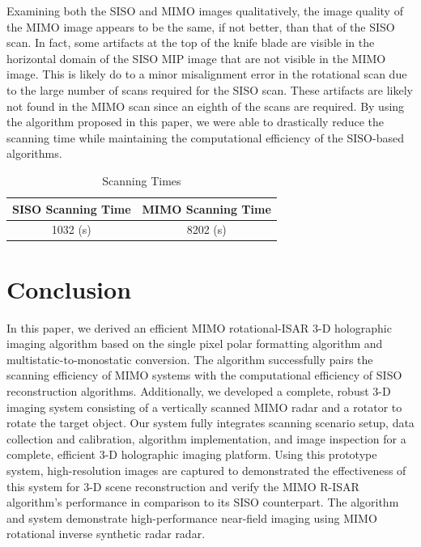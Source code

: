 \documentclass[conference]{IEEEtran}
\begin{document}
		Examining both the SISO and MIMO images qualitatively, the image quality of the MIMO image appears to be the same, if not better, than that of the SISO scan. In fact, some artifacts at the top of the knife blade are visible in the horizontal domain of the SISO MIP image that are not visible in the MIMO image. This is likely do to a minor misalignment error in the rotational scan due to the large number of scans required for the SISO scan. These artifacts are likely not found in the MIMO scan since an eighth of the scans are required. By using the algorithm proposed in this paper, we were able to drastically reduce the scanning time while maintaining the computational efficiency of the SISO-based algorithms.
		
		\begin{table} [h]
			\caption{\label{table_scanning_times}Scanning Times}
			\centering
			\begin{tabular}{c c}
				\hline
				SISO Scanning Time & MIMO Scanning Time  \\ [0.5ex] 
				\hline
			    1032 (s) & 8202 (s) \\
				\hline
			\end{tabular}
		\end{table}
				
		\section{Conclusion}
		\label{Sec_conclusion}
		In this paper, we derived an efficient MIMO rotational-ISAR 3-D holographic imaging algorithm based on the single pixel polar formatting algorithm and multistatic-to-monostatic conversion. The algorithm successfully pairs the scanning efficiency of MIMO systems with the computational efficiency of SISO reconstruction algorithms. Additionally, we developed a complete, robust 3-D imaging system consisting of a vertically scanned MIMO radar and a rotator to rotate the target object. Our system fully integrates scanning scenario setup, data collection and calibration, algorithm implementation, and image inspection for a complete, efficient 3-D holographic imaging platform. Using this prototype system, high-resolution images are captured to demonstrated the effectiveness of this system for 3-D scene reconstruction and verify the MIMO R-ISAR algorithm's performance in comparison to its SISO counterpart. The algorithm and system demonstrate high-performance near-field imaging using MIMO rotational inverse synthetic radar radar.
		
\end{document}
